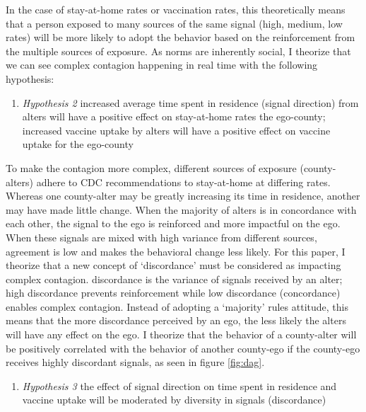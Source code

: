 In the case of stay-at-home rates or vaccination rates, this theoretically means
that a person exposed to many sources of the same signal (high, medium, low
rates) will be more likely to adopt the behavior based on the reinforcement from
the multiple sources of exposure. As norms are inherently social, I theorize
that we can see complex contagion happening in real time with the following
hypothesis:

\begin{enumerate}
\def\labelenumi{(\arabic{enumi})}
\setcounter{enumi}{1}
\tightlist
\item
  \emph{Hypothesis 2} increased average time spent in residence (signal direction) from alters will have a positive effect on stay-at-home rates the ego-county; increased vaccine uptake by alters will have a positive effect on vaccine uptake for the ego-county
\end{enumerate}

To make the contagion more complex, different sources of exposure
(county-alters) adhere to CDC recommendations to stay-at-home at differing
rates. Whereas one county-alter may be greatly increasing its time in residence,
another may have made little change. When the majority of alters is in
concordance with each other, the signal to the ego is reinforced and more
impactful on the ego. When these signals are mixed with high variance from
different sources, agreement is low and makes the behavioral change less likely.
For this paper, I theorize that a new concept of `discordance' must be
considered as impacting complex contagion. discordance is the variance of
signals received by an alter; high discordance prevents reinforcement while low
discordance (concordance) enables complex contagion. Instead of adopting a
`majority' rules attitude, this means that the more discordance perceived by an
ego, the less likely the alters will have any effect on the ego. I theorize that
the behavior of a county-alter will be positively correlated with the behavior
of another county-ego if the county-ego receives highly discordant signals, as
seen in figure \ref{fig:dag}.

\begin{enumerate}
\def\labelenumi{(\arabic{enumi})}
\setcounter{enumi}{2}
\tightlist
\item
  \emph{Hypothesis 3} the effect of signal direction on time spent in residence and vaccine uptake will be moderated by diversity in signals (discordance)
\end{enumerate}

